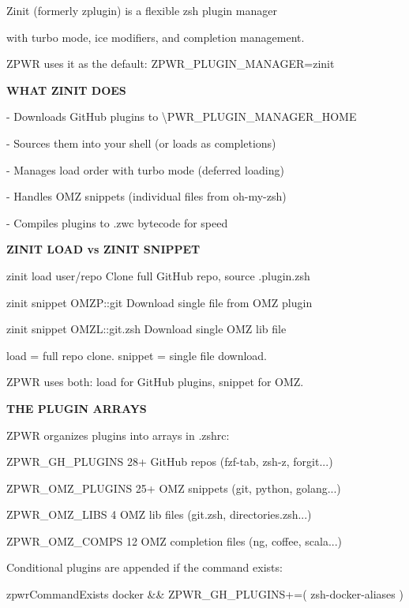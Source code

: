 \documentclass[11pt,a4paper,twoside]{book}
\begin{document}
Zinit (formerly zplugin) is a flexible zsh plugin manager

with turbo mode, ice modifiers, and completion management.

ZPWR uses it as the default: ZPWR\_PLUGIN\_MANAGER=zinit


\vspace{12pt}
{\bfseries\color{neonyellow} WHAT ZINIT DOES}\vspace{4pt}

- Downloads GitHub plugins to \textbackslash{}PWR\_PLUGIN\_MANAGER\_HOME

- Sources them into your shell (or loads as completions)

- Manages load order with turbo mode (deferred loading)

- Handles OMZ snippets (individual files from oh-my-zsh)

- Compiles plugins to .zwc bytecode for speed


\vspace{12pt}
{\bfseries\color{neonyellow} ZINIT LOAD vs ZINIT SNIPPET}\vspace{4pt}

zinit load user/repo      Clone full GitHub repo, source .plugin.zsh

zinit snippet OMZP::git    Download single file from OMZ plugin

zinit snippet OMZL::git.zsh Download single OMZ lib file

load = full repo clone. snippet = single file download.

ZPWR uses both: load for GitHub plugins, snippet for OMZ.


\vspace{12pt}
{\bfseries\color{neonyellow} THE PLUGIN ARRAYS}\vspace{4pt}

ZPWR organizes plugins into arrays in .zshrc:

ZPWR\_GH\_PLUGINS   28+ GitHub repos (fzf-tab, zsh-z, forgit...)

ZPWR\_OMZ\_PLUGINS  25+ OMZ snippets (git, python, golang...)

ZPWR\_OMZ\_LIBS     4 OMZ lib files (git.zsh, directories.zsh...)

ZPWR\_OMZ\_COMPS    12 OMZ completion files (ng, coffee, scala...)

Conditional plugins are appended if the command exists:

\begin{codebox}
zpwrCommandExists docker \&\& ZPWR\_GH\_PLUGINS+=( zsh-docker-aliases )\\
\end{codebox}
\end{document}

